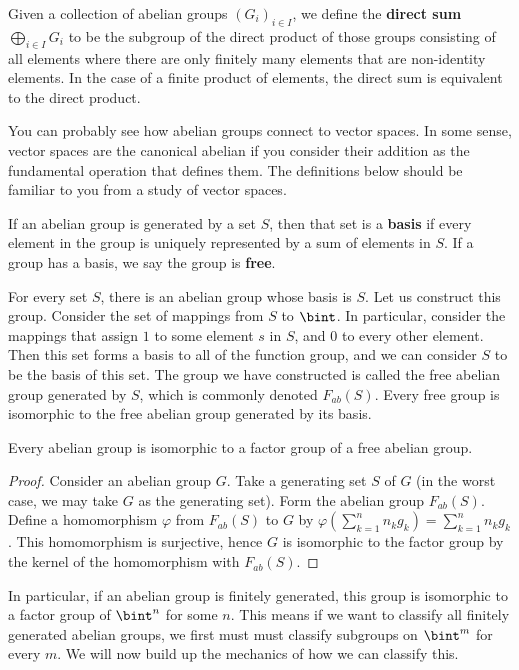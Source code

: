 Given a collection of abelian groups $(G_i)_{i \in I}$, we define the {\bf direct sum} $\bigoplus_{i \in I} G_i$ to be the subgroup of the direct product of those groups consisting of all elements where there are only finitely many elements that are non-identity elements. In the case of a finite product of elements, the direct sum is equivalent to the direct product.

You can probably see how abelian groups connect to vector spaces. In some sense, vector spaces are the canonical abelian if you consider their addition as the fundamental operation that defines them. The definitions below should be familiar to you from a study of vector spaces.

If an abelian group is generated by a set $S$, then that set is a {\bf basis} if every element in the group is uniquely represented by a sum of elements in $S$. If a group has a basis, we say the group is {\bf free}.

For every set $S$, there is an abelian group whose basis is $S$. Let us construct this group. Consider the set of mappings from $S$ to $\bint$. In particular, consider the mappings that assign $1$ to some element $s$ in $S$, and $0$ to every other element. Then this set forms a basis to all of the function group, and we can consider $S$ to be the basis of this set. The group we have constructed is called the free abelian group generated by $S$, which is commonly denoted $F_{ab}(S)$. Every free group is isomorphic to the free abelian group generated by its basis.

\begin{theorem}
    Every abelian group is isomorphic to a factor group of a free abelian group.
\end{theorem}
\begin{proof}
    Consider an abelian group $G$. Take a generating set $S$ of $G$ (in the worst case, we may take $G$ as the generating set). Form the abelian group $F_{ab}(S)$. Define a homomorphism $\varphi$ from $F_{ab}(S)$ to $G$ by $\varphi(\sum_{k = 1}^n n_kg_k) = \sum_{k = 1}^n n_kg_k$. This homomorphism is surjective, hence $G$ is isomorphic to the factor group by the kernel of the homomorphism with $F_{ab}(S)$.
\end{proof}

In particular, if an abelian group is finitely generated, this group is isomorphic to a factor group of $\bint^n$ for some $n$. This means if we want to classify all finitely generated abelian groups, we first must must classify subgroups on $\bint^m$ for every $m$. We will now build up the mechanics of how we can classify this.

